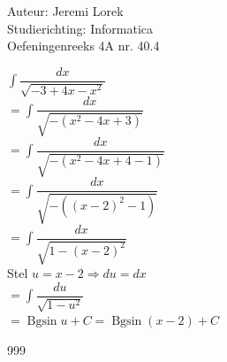 \documentclass[a4paper]{article}
\begin{document}
\noindent \large Auteur: Jeremi Lorek\\
\noindent \large Studierichting: Informatica\\
\noindent \large Oefeningenreeks 4A nr. 40.4\\

\medskip
\normalsize

$\displaystyle \int \dfrac{dx}{\sqrt{-3 + 4x - x^2}}$ \\

$= \displaystyle \int \dfrac{dx}{\sqrt{-(x^2 - 4x + 3)}}$ \\

$= \displaystyle \int \dfrac{dx}{\sqrt{-(x^2 - 4x + 4 - 1)}}$ \\

$= \displaystyle \int \dfrac{dx}{\sqrt{-((x - 2)^2 - 1)}}$ \\

$= \displaystyle \int \dfrac{dx}{\sqrt{1 - (x - 2)^2}}$ \\

Stel $u = x - 2 \Rightarrow du = dx$\\

$= \displaystyle \int \dfrac{du}{\sqrt{1 - u^2}}$ \\

$= \operatorname{Bgsin} u + C = \operatorname{Bgsin}(x - 2) + C$ \\

\begin{thebibliography}{999}
\end{thebibliography}
\end{document}
